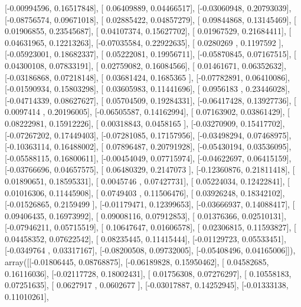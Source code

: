 \documentclass{article}
\begin{document}
       [-0.00994596,  0.16517848],
       [ 0.06409889,  0.04466517],
       [-0.03060948,  0.20793039],
       [-0.08756574,  0.09671018],
       [ 0.02885422,  0.04857279],
       [ 0.09844868,  0.13145469],
       [ 0.01906855,  0.23545687],
       [ 0.04107374,  0.15627702],
       [ 0.01967529,  0.21684411],
       [ 0.04631965,  0.12213263],
       [-0.07035584,  0.22922635],
       [ 0.0280269 ,  0.1197592 ],
       [-0.05923001,  0.18682337],
       [ 0.05222081,  0.19956711],
       [-0.05870845,  0.07167515],
       [ 0.04300108,  0.07833191],
       [ 0.02759082,  0.16084566],
       [ 0.01461671,  0.06352632],
       [-0.03186868,  0.07218148],
       [ 0.03681424,  0.1685365 ],
       [-0.07782891,  0.06410086],
       [-0.01590934,  0.15803298],
       [ 0.03605983,  0.11441696],
       [ 0.0956183 ,  0.23446028],
       [-0.04714339,  0.08627627],
       [ 0.05704509,  0.19284331],
       [-0.06417428,  0.13927736],
       [ 0.0097414 ,  0.20196005],
       [-0.06505587,  0.14162994],
       [ 0.07163902,  0.03861429],
       [ 0.08222981,  0.15912226],
       [ 0.00318843,  0.0458165 ],
       [-0.03270909,  0.15417702],
       [-0.07267202,  0.17449403],
       [-0.07281085,  0.17157956],
       [-0.03498294,  0.07468975],
       [-0.10363114,  0.16488002],
       [ 0.07896487,  0.20791928],
       [-0.05430194,  0.03536095],
       [-0.05588115,  0.16800611],
       [-0.00454049,  0.07715974],
       [-0.04622697,  0.06415159],
       [-0.03766696,  0.04657575],
       [ 0.06480329,  0.2147073 ],
       [-0.12360876,  0.21811418],
       [ 0.01890651,  0.18595331],
       [ 0.0045746 ,  0.07427731],
       [ 0.05224034,  0.12422841],
       [ 0.01016306,  0.11445908],
       [ 0.0749403 ,  0.11506476],
       [ 0.03926248,  0.18342102],
       [-0.01526865,  0.2159499 ],
       [-0.01179471,  0.12399653],
       [-0.03666937,  0.14088417],
       [ 0.09406435,  0.16973992],
       [ 0.09008116,  0.07912853],
       [ 0.01376366,  0.02510131],
       [-0.07946211,  0.05715519],
       [ 0.10647647,  0.01606578],
       [ 0.02306815,  0.11593827],
       [ 0.04458352,  0.07622542],
       [ 0.08235445,  0.11415444],
       [-0.01129723,  0.05533451],
       [-0.0349764 ,  0.03317167],
       [-0.08200508,  0.09732005],
       [-0.05408496,  0.04165006]]), array([[-0.01806445,  0.08768875],
       [-0.06189828,  0.15950462],
       [ 0.04582685,  0.16116036],
       [-0.02117728,  0.18002431],
       [ 0.01756308,  0.07276297],
       [ 0.10558183,  0.07251635],
       [ 0.0627917 ,  0.0602677 ],
       [-0.03017887,  0.14252945],
       [-0.01333138,  0.11010261],
\end{document}
